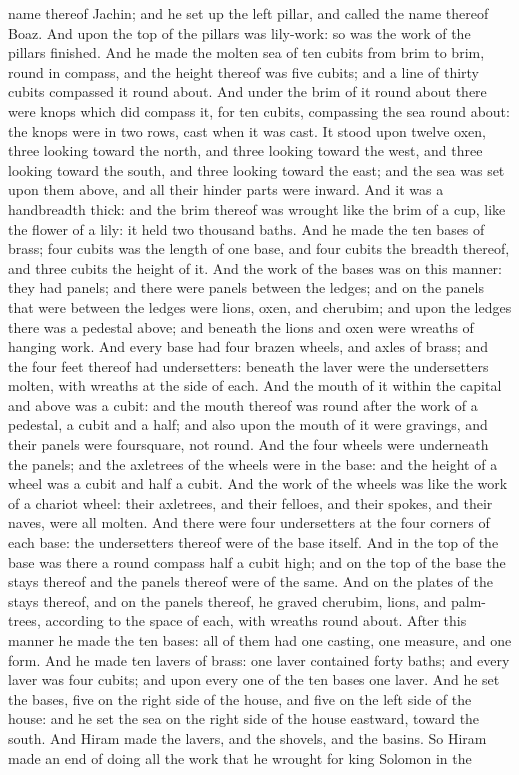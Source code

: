 name thereof Jachin; and he set up the left pillar, and called the name thereof Boaz. And upon the top of the pillars was lily-work: so was the work of the pillars finished.  And he made the molten sea of ten cubits from brim to brim, round in compass, and the height thereof was five cubits; and a line of thirty cubits compassed it round about. And under the brim of it round about there were knops which did compass it, for ten cubits, compassing the sea round about: the knops were in two rows, cast when it was cast. It stood upon twelve oxen, three looking toward the north, and three looking toward the west, and three looking toward the south, and three looking toward the east; and the sea was set upon them above, and all their hinder parts were inward. And it was a handbreadth thick: and the brim thereof was wrought like the brim of a cup, like the flower of a lily: it held two thousand baths.  And he made the ten bases of brass; four cubits was the length of one base, and four cubits the breadth thereof, and three cubits the height of it. And the work of the bases was on this manner: they had panels; and there were panels between the ledges; and on the panels that were between the ledges were lions, oxen, and cherubim; and upon the ledges there was a pedestal above; and beneath the lions and oxen were wreaths of hanging work. And every base had four brazen wheels, and axles of brass; and the four feet thereof had undersetters: beneath the laver were the undersetters molten, with wreaths at the side of each. And the mouth of it within the capital and above was a cubit: and the mouth thereof was round after the work of a pedestal, a cubit and a half; and also upon the mouth of it were gravings, and their panels were foursquare, not round. And the four wheels were underneath the panels; and the axletrees of the wheels were in the base: and the height of a wheel was a cubit and half a cubit. And the work of the wheels was like the work of a chariot wheel: their axletrees, and their felloes, and their spokes, and their naves, were all molten. And there were four undersetters at the four corners of each base: the undersetters thereof were of the base itself. And in the top of the base was there a round compass half a cubit high; and on the top of the base the stays thereof and the panels thereof were of the same. And on the plates of the stays thereof, and on the panels thereof, he graved cherubim, lions, and palm-trees, according to the space of each, with wreaths round about. After this manner he made the ten bases: all of them had one casting, one measure, and one form.  And he made ten lavers of brass: one laver contained forty baths; and every laver was four cubits; and upon every one of the ten bases one laver. And he set the bases, five on the right side of the house, and five on the left side of the house: and he set the sea on the right side of the house eastward, toward the south.  And Hiram made the lavers, and the shovels, and the basins. So Hiram made an end of doing all the work that he wrought for king Solomon in the 
